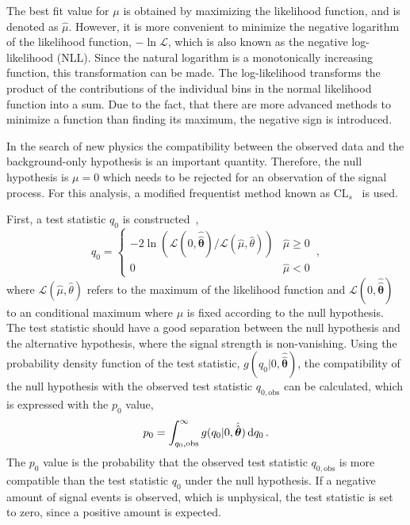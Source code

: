 The best fit value for $\mu$ is obtained by maximizing the likelihood function, and is denoted as $\hat{\mu}$.
However, it is more convenient to minimize the negative logarithm of the likelihood function, $- \ln \mathcal{L}$, which is also known as the negative log-likelihood (NLL).
Since the natural logarithm is a monotonically increasing function, this transformation can be made.
The log-likelihood transforms the product of the contributions of the individual bins in the normal likelihood function into a sum.
Due to the fact, that there are more advanced methods to minimize a function than finding its maximum, the negative sign is introduced.

In the search of new physics the compatibility between the observed data and the background-only hypothesis is an important quantity.
Therefore, the null hypothesis is $\mu = 0$ which needs to be rejected for an observation of the signal process.
For this analysis, a modified frequentist method known as $\text{CL}_s$~\cite{CLs} is used.

First, a test statistic $q_0$ is constructed~\cite{FitATLAS},
\begin{equation}
    q_0 =
    \begin{cases}
        -2 \ln (\mathcal{L}(0, \hat{\hat{\bm{\theta}}}) / \mathcal{L}(\hat{\mu}, \hat{\theta})) & \hat{\mu} \geq 0 \\
        0 &  \hat{\mu} < 0
    \end{cases} \,,
\end{equation}
where $\mathcal{L}(\hat{\mu}, \hat{\theta})$ refers to the maximum of the likelihood function and $\mathcal{L}(0, \hat{\hat{\bm{\theta}}})$ to
an conditional maximum where $\mu$ is fixed according to the null hypothesis.
The test statistic should have a good separation between the null hypothesis and the alternative hypothesis, where the signal strength is non-vanishing.
Using the probability density function of the test statistic, $g(q_0 | 0, \hat{\hat{\bm{\theta}}})$,
the compatibility of the null hypothesis with the observed test statistic $q_{0,\text{obs}}$
can be calculated, which is expressed with the $p_0$ value,
\begin{equation}
    p_0 = \int_{q_0,\text{obs}}^{\infty} g(q_0 | 0, \hat{\hat{\bm{\theta}}}) \dif q_0 \,.
\end{equation}
The $p_0$ value is the probability that the observed test statistic $q_{0,\text{obs}}$ is more compatible than the test statistic $q_0$ under
the null hypothesis.
If a negative amount of signal events is observed, which is unphysical, the test statistic is set to zero, since a positive amount is expected.

